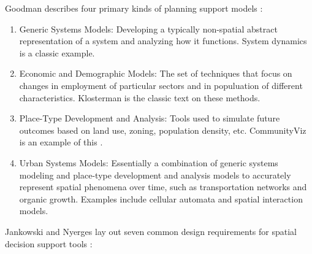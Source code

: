 Goodman describes four primary kinds of planning support models \cite{goodspeedScenarioPlanningCities2020}: 

\begin{enumerate}[itemsep=0pt,parsep=0pt]
	\item{Generic Systems Models: Developing a typically non-spatial abstract representation of a system and analyzing how it functions. System dynamics is a classic example.}
	\item{Economic and Demographic Models: The set of techniques that focus on changes in employment of particular sectors and in populuation of different characteristics. Klosterman is the classic text on these methods. \cite{klostermanCommunityAnalysisPlanning1990}}
	\item{Place-Type Development and Analysis: Tools used to simulate future outcomes based on land use, zoning, population density, etc. CommunityViz is an example of this \cite{walkerPlannersGuideCommunityViz2017}.}
	\item{Urban Systems Models: Essentially a combination of generic systems modeling and place-type development and analysis models to accurately represent spatial phenomena over time, such as transportation networks and organic growth. Examples include cellular automata and spatial interaction models.}
\end{enumerate}


Jankowski and Nyerges lay out seven common design requirements for spatial decision support tools \cite{jankowskiGISGroupDecision2001}:

